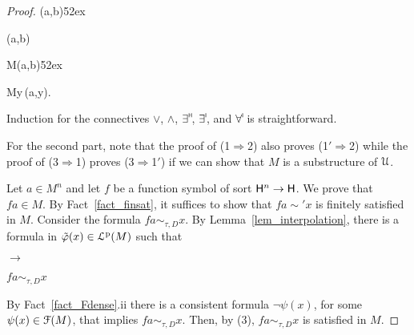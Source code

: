 \documentclass[10pt,oneside]{amsproc}
\newcommand{\mylabel}[1]{{#1}\hfill}
\renewenvironment{itemize}
  {\begin{list}{$\triangleright$}{%
  \setlength{\parskip}{0mm}
  \setlength{\topsep}{.4\baselineskip}
  \setlength{\rightmargin}{0mm}
  \setlength{\listparindent}{0mm}
  \setlength{\itemindent}{0mm}
  \setlength{\labelwidth}{3ex}
  \setlength{\itemsep}{.2\baselineskip}
  \setlength{\parsep}{.2\baselineskip}
  \setlength{\partopsep}{0mm}
  \setlength{\labelsep}{1ex}
  \setlength{\leftmargin}{\labelwidth+\labelsep}
  \let\makelabel\mylabel}}{%
\end{list}}
\def\forallH{\forall}
\def\existsH{\exists}
\begin{document}
{\begin{proof}
  \ceq{}
  {\Rightarrow}
  {\neg\psi(a,b)}\hfill{}\kern52ex
  
  \ceq{}
  {\Rightarrow}
  {\neg\varphi(a,b)}
  
  \ceq{}
  {\Rightarrow}
  {M\models\neg\varphi(a,b)}\hfill{}\kern52ex

  \ceq{}
  {\Rightarrow}
  {M\not\models\forallH y\,\varphi(a,y).}

  Induction for the connectives $\vee$, $\wedge$, $\exists\raisebox{1.1ex}{\scaleto{\sf H}{.8ex}\kern-.2ex}$, $\exists\raisebox{1.1ex}{\scaleto{\sf I}{.8ex}\kern-.2ex}$, and $\forall\raisebox{1.1ex}{\scaleto{\sf I}{.8ex}\kern-.2ex}$ is straightforward.

  For the second part, note that the proof of (1$\Rightarrow$2) also proves (1$'\Rightarrow$2) while the proof of (3$\Rightarrow$1) proves (3$\Rightarrow$1$'$) if we can show that $M$ is a substructure of ${\EuScript U}$.
  
  Let $a\in M^{n}$ and let $f$ be a function symbol of sort ${\sf H}^{n}\to{\sf H}$.
  We prove that $fa\in M$.
  By Fact~\ref{fact_finsat}, it suffices to show that $fa\sim' x$ is finitely satisfied in $M$.
  Consider the formula $fa\sim_{\tau,D} x$.
  By Lemma~\ref{lem_interpolation}, there is a formula in $\tilde{\varphi}(x)\in{\EuScript L}^{\rm p}(M)$ such that
  
  \parbox{6ex}{\hfil$\rightarrow$}$fa\sim_{\tau,D} x$

  By Fact~\ref{fact_Fdense}.ii there is a consistent formula  $\neg\psi(x)$, for some $\psi(x)\in{\EuScript F}(M)$, that implies $fa\sim_{\tau,D} x$.
  Then, by (3), $fa\sim_{\tau,D} x$ is satisfied in $M$.
\end{proof}

    
   
}
\end{document}
